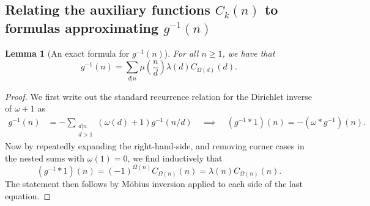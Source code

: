 \documentclass[11pt,reqno,a4letter]{article}
\numberwithin{figure}{section}
\numberwithin{table}{section}
\theoremstyle{plain}
\newtheorem{lemma}[theorem]{Lemma}
\numberwithin{theorem}{section}
\theoremstyle{definition}
\newtheorem{remark}[theorem]{Remark}
\begin{document}

\subsection{Relating the auxiliary functions $C_k(n)$ to formulas approximating $g^{-1}(n)$} 
\label{subSection_Relating_CknFuncs_to_gInvn} 

\begin{lemma}[An exact formula for $g^{-1}(n)$] 
\label{lemma_AnExactFormulaFor_gInvByMobiusInv_v1} 
For all $n \geq 1$, we have that 
\[
g^{-1}(n) = \sum_{d|n} \mu\left(\frac{n}{d}\right) \lambda(d) C_{\Omega(d)}(d). 
\]
\end{lemma}
\begin{proof} 
We first write out the standard recurrence relation for the Dirichlet inverse of 
$\omega+1$ as 
\begin{align*} 
g^{-1}(n) & = - \sum_{\substack{d|n \\ d>1}} (\omega(d) + 1) g^{-1}(n/d) 
     \quad\implies\quad 
     (g^{-1} \ast 1)(n) = -(\omega \ast g^{-1})(n). 
\end{align*} 
Now by repeatedly expanding the right-hand-side, and removing corner cases in the nested sums with 
$\omega(1) = 0$, we find inductively that 
\[
(g^{-1} \ast 1)(n) = (-1)^{\Omega(n)} C_{\Omega(n)}(n) = \lambda(n) C_{\Omega(n)}(n). 
\]
The statement then follows by M\"obius inversion applied to each side of the last equation. 
\end{proof} 
\end{document}
